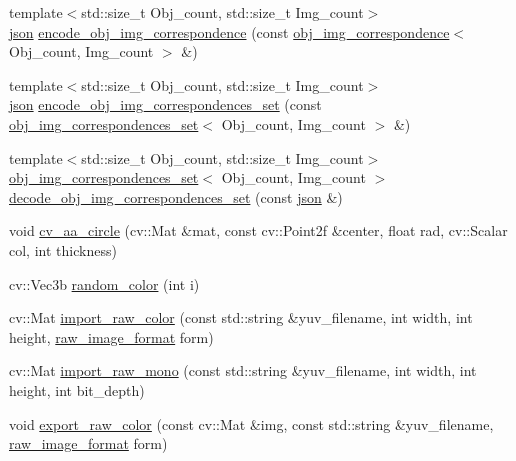\begin{DoxyCompactItemize}
\item 
{\footnotesize template$<$std\+::size\+\_\+t Obj\+\_\+count, std\+::size\+\_\+t Img\+\_\+count$>$ }\\\hyperlink{namespacetlz_ac400657dfcddf6309a769aefc23eed0c}{json} \hyperlink{namespacetlz_a6028c903330bbc199e3ca067cf3893cf}{encode\+\_\+obj\+\_\+img\+\_\+correspondence} (const \hyperlink{structtlz_1_1obj__img__correspondence}{obj\+\_\+img\+\_\+correspondence}$<$ Obj\+\_\+count, Img\+\_\+count $>$ \&)
\item 
{\footnotesize template$<$std\+::size\+\_\+t Obj\+\_\+count, std\+::size\+\_\+t Img\+\_\+count$>$ }\\\hyperlink{namespacetlz_ac400657dfcddf6309a769aefc23eed0c}{json} \hyperlink{namespacetlz_ad1dd4f34c6ed90450cf085bc95f0a393}{encode\+\_\+obj\+\_\+img\+\_\+correspondences\+\_\+set} (const \hyperlink{namespacetlz_a3dec48786e0f39d39c096eb127945c27}{obj\+\_\+img\+\_\+correspondences\+\_\+set}$<$ Obj\+\_\+count, Img\+\_\+count $>$ \&)
\item 
{\footnotesize template$<$std\+::size\+\_\+t Obj\+\_\+count, std\+::size\+\_\+t Img\+\_\+count$>$ }\\\hyperlink{namespacetlz_a3dec48786e0f39d39c096eb127945c27}{obj\+\_\+img\+\_\+correspondences\+\_\+set}$<$ Obj\+\_\+count, Img\+\_\+count $>$ \hyperlink{namespacetlz_a702c94cfce75a8ea30c7e960c817ab24}{decode\+\_\+obj\+\_\+img\+\_\+correspondences\+\_\+set} (const \hyperlink{namespacetlz_ac400657dfcddf6309a769aefc23eed0c}{json} \&)
\item 
void \hyperlink{namespacetlz_a6c23bd1f5f2f91d3c3af2c32bfe32065}{cv\+\_\+aa\+\_\+circle} (cv\+::\+Mat \&mat, const cv\+::\+Point2f \&center, float rad, cv\+::\+Scalar col, int thickness)
\item 
cv\+::\+Vec3b \hyperlink{namespacetlz_ac822758bd15e79a45a9529097026c9bc}{random\+\_\+color} (int i)
\item 
cv\+::\+Mat \hyperlink{namespacetlz_a3bddcd47f2814721b6dcbce3ff38ad29}{import\+\_\+raw\+\_\+color} (const std\+::string \&yuv\+\_\+filename, int width, int height, \hyperlink{namespacetlz_a2f57d45973aaddeff07516fa8cc48e46}{raw\+\_\+image\+\_\+format} form)
\item 
cv\+::\+Mat \hyperlink{namespacetlz_aca079a3372b17056eb30950d52737d38}{import\+\_\+raw\+\_\+mono} (const std\+::string \&yuv\+\_\+filename, int width, int height, int bit\+\_\+depth)
\item 
void \hyperlink{namespacetlz_ae3f8393be662f8f617b5350138b7002f}{export\+\_\+raw\+\_\+color} (const cv\+::\+Mat \&img, const std\+::string \&yuv\+\_\+filename, \hyperlink{namespacetlz_a2f57d45973aaddeff07516fa8cc48e46}{raw\+\_\+image\+\_\+format} form)

\end{DoxyCompactItemize}
